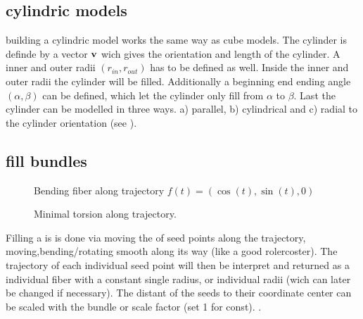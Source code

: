 \subsection{cylindric models}
% 
building a cylindric model works the same way as cube models.
The cylinder is definde by a vector $\mathbf{v}$ wich gives the orientation and length of the cylinder.
A inner and outer radii $(r_{\mathit{in}}, r_{\mathit{out}})$ has to be defined as well.
Inside the inner and outer radii the cylinder will be filled.
Additionally a beginning end ending angle $(\alpha, \beta)$ can be defined, which let the cylinder only fill from $\alpha$ to $\beta$.
Last the cylinder can be modelled in three ways. a) parallel, b) cylindrical and c) radial to the cylinder orientation (see \dummy).
% 
\subsection{fill bundles}\label{sec:fillBundle}
% 
\begin{figure}[!t]
    \centering
	\caption[]{Bending fiber along trajectory $f(t) = \left( \cos(t), \sin(t), 0 \right)$}
	\label{fig:circleBundle}
\end{figure}
% 
\begin{figure}[!t]
    \def\tikzheight{0.75\textwidth}
    \centering
	\caption{Minimal torsion along trajectory.}
\end{figure}
% 
Filling a  is is done via moving the  of seed points along the trajectory, moving,bending/rotating smooth along its way (like a good rolercoster).
The trajectory of each individual seed point will then be interpret and returned as a individual fiber with a constant single radius, or individual radii (wich can later be changed if necessary).
The distant of the seeds to their coordinate center can be scaled with the bundle  or scale factor (set 1 for const). .
% 
